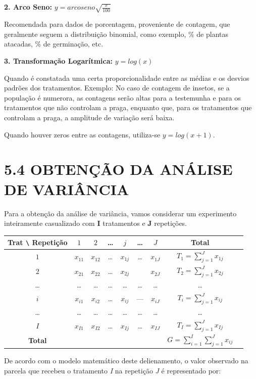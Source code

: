 \documentclass[
]{book}
\begin{document}
\textbf{2. Arco Seno:} \(y=arcoseno\sqrt{\frac{x}{100}}\)

Recomendada para dados de porcentagem, proveniente de contagem, que geralmente seguem a distribuição binomial, como exemplo, \% de plantas atacadas, \% de germinação, etc.

\textbf{3. Transformação Logarítmica:} \(y=log{(x)}\)

Quando é constatada uma certa proporcionalidade entre as médias e os desvios padrões dos tratamentos. Exemplo: No caso de contagem de insetos, se a população é numerora, as contagens serão altas para a testemunha e para os tratamentos que não controlam a praga, enquanto que, para os tratamentos que controlam a praga, a amplitude de variação será baixa.

Quando houver zeros entre as contagens, utiliza-se \(y=log(x+1)\).

\hypertarget{obtenuxe7uxe3o-da-anuxe1lise-de-variuxe2ncia}{%
\section{5.4 OBTENÇÃO DA ANÁLISE DE VARIÂNCIA}\label{obtenuxe7uxe3o-da-anuxe1lise-de-variuxe2ncia}}

Para a obtenção da análise de variância, vamos considerar um experimento inteiramente casualizado com \textbf{I} tratamentos e \textbf{J} repetições.

\begin{longtable}[]{@{}ccccccccc@{}}
\toprule
Trat \texttt{\textbackslash{}} Repetição & \(1\) & \(2\) & \ldots{} & \(j\) & \ldots{} & \(J\) & Total &\tabularnewline
\midrule
\endhead
\(1\) & \(x_{11}\) & \(x_{12}\) & \ldots{} & \(x_{1j}\) & \ldots{} & \(x_{1J}\) & \(T_1 = \sum_{j=1}^J x_{1j}\) &\tabularnewline
\(2\) & \(x_{21}\) & \(x_{22}\) & \ldots{} & \(x_{2j}\) & & \(x_{2J}\) & \(T_2 = \sum_{j=1}^J x_{2j}\) &\tabularnewline
\ldots{} & \ldots{} & \ldots{} & \ldots{} & \ldots{} & \ldots{} & \ldots{} & \ldots{} &\tabularnewline
\(i\) & \(x_{i1}\) & \(x_{i2}\) & \ldots{} & \(x_{ij}\) & --- & \(x_{iJ}\) & \(T_i = \sum_{j=1}^J x_{ij}\) &\tabularnewline
\ldots{} & \ldots{} & \ldots{} & \ldots{} & \ldots{} & \ldots{} & \ldots{} & \ldots{} &\tabularnewline
\(I\) & \(x_{I1}\) & \(x_{I2}\) & \ldots{} & \(x_{Ij}\) & \ldots{} & \(x_{IJ}\) & \(T_I = \sum_{j=1}^J x_{Ij}\) &\tabularnewline
\textbf{Total} & & & & & & & \(G = \sum_{i=1}^I\sum_{j=1}^J x_{ij}\) &\tabularnewline
\bottomrule
\end{longtable}

De acordo com o modelo matemático deste delienamento, o valor observado na parcela que recebeu o tratamento \emph{I} na repetição \emph{J} é representado por:
\end{document}
